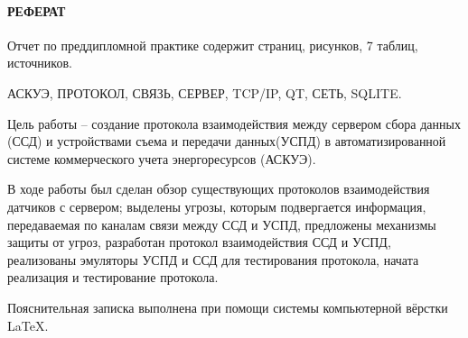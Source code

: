 \newpage
{}
\paragraph*{\hfill РЕФЕРАТ \hfill}
Отчет по преддипломной практике содержит  страниц,  рисунков, 7 таблиц,  источников.

АСКУЭ, ПРОТОКОЛ, СВЯЗЬ, СЕРВЕР, TCP/IP, QT, СЕТЬ, SQLITE.

Цель работы -- создание протокола взаимодействия между сервером сбора данных (ССД) и устройствами съема и передачи данных(УСПД) в автоматизированной системе коммерческого учета энергоресурсов (АСКУЭ).

В ходе работы был сделан обзор существующих протоколов взаимодействия датчиков с сервером; выделены угрозы, которым подвергается информация, передаваемая по каналам связи между ССД и УСПД, предложены механизмы защиты от угроз, разработан протокол взаимодействия ССД и УСПД, реализованы эмуляторы УСПД и ССД для тестирования протокола, начата реализация и тестирование протокола.  %

Пояснительная записка выполнена при помощи системы компьютерной вёрстки \LaTeX.